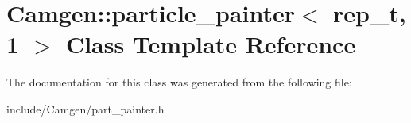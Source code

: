 \hypertarget{a00405}{}\section{Camgen\+:\+:particle\+\_\+painter$<$ rep\+\_\+t, 1 $>$ Class Template Reference}
\label{a00405}


The documentation for this class was generated from the following file\+:\begin{DoxyCompactItemize}
\item 
include/\+Camgen/part\+\_\+painter.\+h\end{DoxyCompactItemize}

